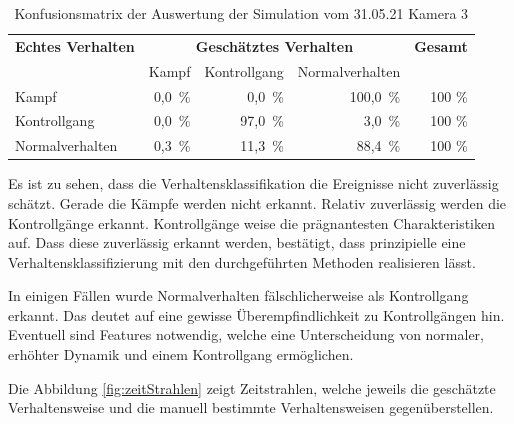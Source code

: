 \begin{table}[htbp]
    \centering
    \caption{Konfusionsmatrix der Auswertung der Simulation vom 31.05.21 Kamera 3}
    \label{tab:KonfMatSim 2}
    \begin{tabular}{l|rrr|r}
        \toprule
        \multirow{1}{*}{\textbf{Echtes Verhalten}} & \multicolumn{3}{c|}{\textbf{Geschätztes Verhalten}} & {\textbf{Gesamt}}\\
         & Kampf & Kontrollgang & Normalverhalten & \\
        \midrule
        Kampf                & 0,0\, \% &  0,0\, \% & 100,0\, \% & 100 \%\\
        Kontrollgang         & 0,0\, \% & 97,0\, \% &   3,0\, \% & 100 \%\\
        Normalverhalten      & 0,3\, \% & 11,3\, \% &  88,4\, \% & 100 \%\\
        \bottomrule
    \end{tabular}
\end{table}

Es ist zu sehen, dass die Verhaltensklassifikation die Ereignisse nicht zuverlässig schätzt. Gerade die Kämpfe werden nicht erkannt. Relativ zuverlässig werden die Kontrollgänge erkannt. Kontrollgänge weise die prägnantesten Charakteristiken auf. Dass diese zuverlässig erkannt werden, bestätigt, dass prinzipielle eine Verhaltensklassifizierung mit den durchgeführten Methoden realisieren lässt. \par

In einigen Fällen wurde Normalverhalten fälschlicherweise als Kontrollgang erkannt. Das deutet auf eine gewisse Überempfindlichkeit zu Kontrollgängen hin. Eventuell sind Features notwendig, welche eine Unterscheidung von normaler, erhöhter Dynamik und einem Kontrollgang ermöglichen. \par

Die Abbildung \ref{fig:zeitStrahlen} zeigt Zeitstrahlen, welche jeweils die geschätzte Verhaltensweise und die manuell bestimmte Verhaltensweisen gegenüberstellen.  

